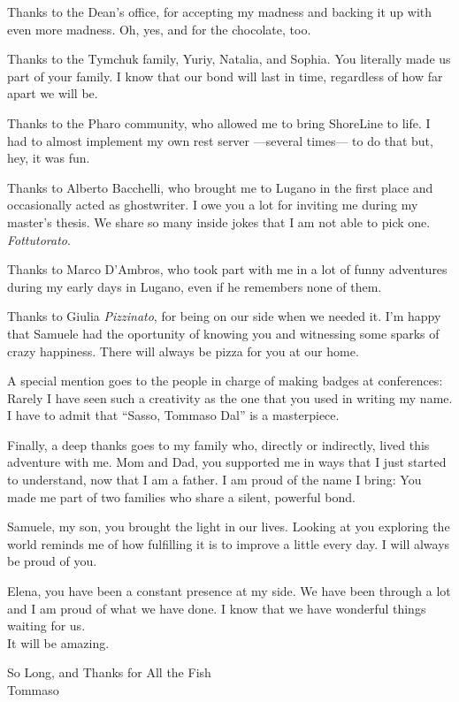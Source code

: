 \begin{acknowledgements}
Thanks to the Dean's office, for accepting my madness and backing it up with even more madness.
Oh, yes, and for the chocolate, too.

Thanks to the Tymchuk family, Yuriy, Natalia, and Sophia.
You literally made us part of your family.
I know that our bond will last in time, regardless of how far apart we will be.

Thanks to the Pharo community, who allowed me to bring ShoreLine to life.
I had to almost implement my own rest server ---several times--- to do that but, hey, it was fun.

Thanks to Alberto Bacchelli, who brought me to Lugano in the first place and occasionally acted as ghostwriter.
I owe you a lot for inviting me during my master's thesis.
We share so many inside jokes that I am not able to pick one. \emph{Fottutorato}.

Thanks to Marco D'Ambros, who took part with me in a lot of funny adventures during my early days in Lugano, even if he remembers none of them.

Thanks to Giulia \emph{Pizzinato}, for being on our side when we needed it.
I'm happy that Samuele had the oportunity of knowing you and witnessing some sparks of crazy happiness.
There will always be pizza for you at our home.

A special mention goes to the people in charge of making badges at conferences: Rarely I have seen such a creativity as the one that you used in writing my name.
I have to admit that ``Sasso, Tommaso Dal'' is a masterpiece.

Finally, a deep thanks goes to my family who, directly or indirectly, lived this adventure with me.
Mom and Dad, you supported me in ways that I just started to understand, now that I am a father.
I am proud of the name I bring: You made me part of two families who share a silent, powerful bond.

Samuele, my son, you brought the light in our lives.
Looking at you exploring the world reminds me of how fulfilling it is to improve a little every day.
I will always be proud of you.

Elena, you have been a constant presence at my side.
We have been through a lot and I am proud of what we have done.
I know that we have wonderful things waiting for us.
\\It will be amazing.


\begin{flushright}
So Long, and Thanks for All the Fish\\
Tommaso
\end{flushright}

\end{acknowledgements}
